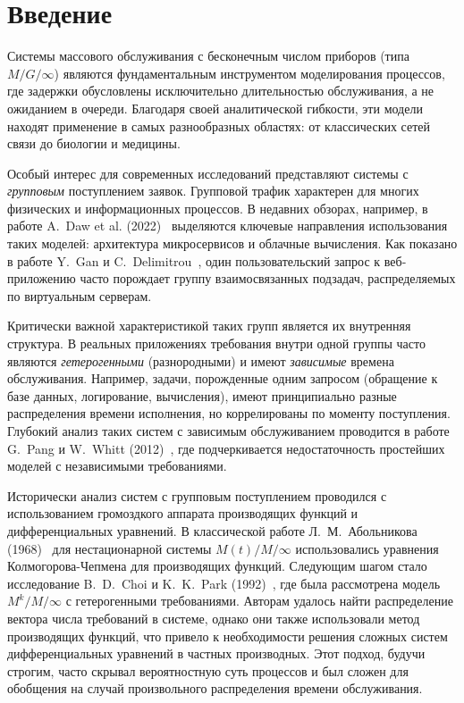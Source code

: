 \documentclass[12pt]{article}
\theoremstyle{plain}
\theoremstyle{definition}
\theoremstyle{remark}
\begin{document}
\clearpage
\thispagestyle{empty}
\null
\newpage

\tableofcontents
\thispagestyle{empty}

\newpage
\mbox{} 
\thispagestyle{empty}

\newpage
\pagestyle{plain}
\setcounter{page}{1} 

\section*{Введение}

Системы массового обслуживания с бесконечным числом приборов (типа $M/G/\infty$) являются фундаментальным инструментом моделирования процессов, где задержки обусловлены исключительно длительностью обслуживания, а не ожиданием в очереди. Благодаря своей аналитической гибкости, эти модели находят применение в самых разнообразных областях: от классических сетей связи до биологии и медицины.

Особый интерес для современных исследований представляют системы с \textit{групповым} поступлением заявок. Групповой трафик характерен для многих физических и информационных процессов. В недавних обзорах, например, в работе A.~Daw et al. (2022)~\cite{daw2022} выделяются ключевые направления использования таких моделей: архитектура микросервисов и облачные вычисления. Как показано в работе Y.~Gan и C.~Delimitrou~\cite{gan2018}, один пользовательский запрос к веб-приложению часто порождает группу взаимосвязанных подзадач, распределяемых по виртуальным серверам.

Критически важной характеристикой таких групп является их внутренняя структура. В реальных приложениях требования внутри одной группы часто являются \textit{гетерогенными} (разнородными) и имеют \textit{зависимые} времена обслуживания. Например, задачи, порожденные одним запросом (обращение к базе данных, логирование, вычисления), имеют принципиально разные распределения времени исполнения, но коррелированы по моменту поступления. Глубокий анализ таких систем с зависимым обслуживанием проводится в работе G.~Pang и W.~Whitt (2012)~\cite{pang2012}, где подчеркивается недостаточность простейших моделей с независимыми требованиями.

Исторически анализ систем с групповым поступлением проводился с использованием громоздкого аппарата производящих функций и дифференциальных уравнений. В классической работе Л.~М.~Абольникова (1968)~\cite{abolnikov1968} для нестационарной системы $M(t)/M/\infty$ использовались уравнения Колмогорова-Чепмена для производящих функций. Следующим шагом стало исследование B.~D.~Choi и K.~K.~Park (1992)~\cite{choi1992}, где была рассмотрена модель $M^k/M/\infty$ с гетерогенными требованиями. Авторам удалось найти распределение вектора числа требований в системе, однако они также использовали метод производящих функций, что привело к необходимости решения сложных систем дифференциальных уравнений в частных производных. Этот подход, будучи строгим, часто скрывал вероятностную суть процессов и был сложен для обобщения на случай произвольного распределения времени обслуживания.
\end{document}
